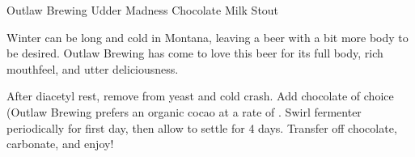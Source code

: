 \begin{recipie}{Outlaw Brewing Udder Madness Chocolate Milk Stout}

\begin{aboutblock}
Winter can be long and cold in Montana, leaving a beer with a bit more body to be
desired. Outlaw Brewing has come to love this beer for its full body, rich
mouthfeel, and utter deliciousness. \sourceaha
\end{aboutblock}


\begin{methodandtiming}
 
\begin{mashsteps}
\end{mashsteps}

\begin{fermentationsteps}
\end{fermentationsteps}

\begin{fermentationsteps}
\end{fermentationsteps}

\begin{directions}
After diacetyl rest, remove from yeast and cold crash. Add chocolate of
choice (Outlaw Brewing prefers an organic cocao at a rate of .
Swirl fermenter periodically for first day, then allow to settle for 4 days.
Transfer off chocolate, carbonate, and enjoy!
\end{directions}

\end{methodandtiming}

\pagebreak

\begin{ingredientsblock}
 
\begin{malts}
\end{malts}

\begin{hops}
\end{hops}


\begin{twists}
\end{twists}

\end{ingredientsblock}

\end{recipie}

